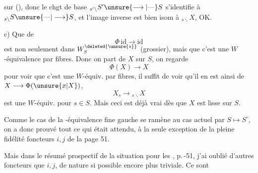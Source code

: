 sur  (), donc le chgt de base ${}_{s'\backslash}S'\unsure{\longrightarrow|\text{---}}S$ s'identifie à ${}_{s\backslash}S\unsure{\text{---}|\longrightarrow}S$, et l'image inverse est bien isom à ${}_{s\backslash}X$, OK.

c) Que de 
\[
 \Phi\,\mathrm{id}\longrightarrow\mathrm{id}
\]
est non seulement dans $W_S^{\deleted{\unsure{s}}}$ (grossier), mais que c'est une $W$-équivalence  par fibres. Donc on part de $X$  sur $S$, on regarde
\[
 \Phi(X)\longrightarrow X
\]
pour voir que c'est une $W$-équiv. par fibres, il suffit de voir qu'il en est ainsi de $X\longrightarrow\Phi(\unsure{x|X})$,  
\[
 X_s\longrightarrow{}_{s\backslash}X
\]
est une $W$-équiv. pour  $s\in S$. Mais ceci est déjà vrai dès que $X$ est lisse sur $S$.

Comme le cas de la -équivalence fine gauche se ramène au cas actuel par $S\mapsto S^\circ$, on a donc prouvé tout ce qui était attendu, à la seule exception de la pleine fidélité  foncteurs $i,j$ de la page 51.

\medskip
Mais dans le résumé prospectif de la situation pour les , p.\,-51, j'ai oublié d'autres foncteurs que $i,j$, de nature si possible encore plus triviale. Ce sont
